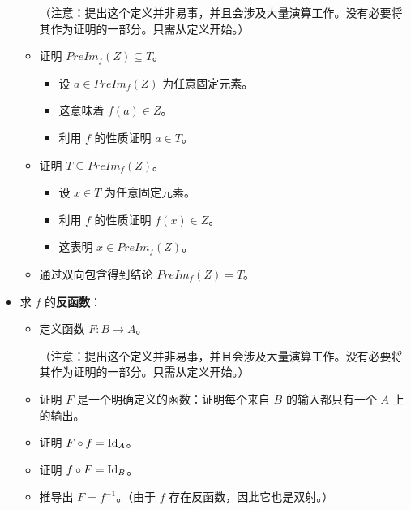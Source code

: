\begin{itemize}
\begin{itemize}
                    （注意：提出这个定义并非易事，并且会涉及大量演算工作。没有必要将其作为证明的一部分。只需从定义开始。）
              \item 证明 $PreIm_f(Z) \subseteq T$。
                    \begin{itemize}
                        \item 设 $a \in PreIm_f(Z)$ 为任意固定元素。
                        \item 这意味着 $f(a) \in Z$。
                        \item 利用 $f$ 的性质证明 $a \in T$。
                    \end{itemize}
              \item 证明 $T \subseteq PreIm_f(Z)$。
                    \begin{itemize}
                        \item 设 $x \in T$ 为任意固定元素。
                        \item 利用 $f$ 的性质证明 $f(x) \in Z$。
                        \item 这表明 $x \in PreIm_f(Z)$。
                    \end{itemize}
              \item 通过双向包含得到结论 $PreIm_f (Z) = T$。
          \end{itemize}
    \item 求 $f$ 的\textbf{反函数}：
          \begin{itemize}
              \item 定义函数 $F: B \to A$。

                    （注意：提出这个定义并非易事，并且会涉及大量演算工作。没有必要将其作为证明的一部分。只需从定义开始。）
              \item 证明 $F$ 是一个明确定义的函数：证明每个来自 $B$ 的输入都只有一个 $A$ 上的输出。
              \item 证明 $F \circ f = \text{Id}_A$。
              \item 证明 $f \circ F = \text{Id}_B$。
              \item 推导出 $F = f^{-1}$。（由于 $f$ 存在反函数，因此它也是双射。）
          \end{itemize}
\end{itemize}

